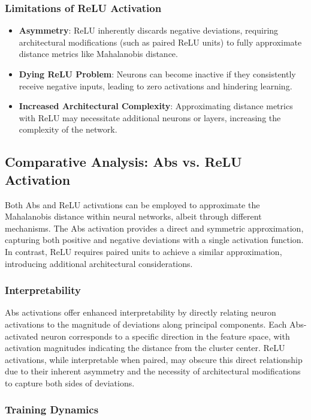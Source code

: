 \subsubsection{Limitations of ReLU Activation}

\begin{itemize}
    \item \textbf{Asymmetry}: ReLU inherently discards negative deviations, requiring architectural modifications (such as paired ReLU units) to fully approximate distance metrics like Mahalanobis distance.
    \item \textbf{Dying ReLU Problem}: Neurons can become inactive if they consistently receive negative inputs, leading to zero activations and hindering learning.
    \item \textbf{Increased Architectural Complexity}: Approximating distance metrics with ReLU may necessitate additional neurons or layers, increasing the complexity of the network.
\end{itemize}

\subsection{Comparative Analysis: Abs vs. ReLU Activation}

Both Abs and ReLU activations can be employed to approximate the Mahalanobis distance within neural networks, albeit through different mechanisms. The Abs activation provides a direct and symmetric approximation, capturing both positive and negative deviations with a single activation function. In contrast, ReLU requires paired units to achieve a similar approximation, introducing additional architectural considerations.

\subsubsection{Interpretability}

Abs activations offer enhanced interpretability by directly relating neuron activations to the magnitude of deviations along principal components. Each Abs-activated neuron corresponds to a specific direction in the feature space, with activation magnitudes indicating the distance from the cluster center. ReLU activations, while interpretable when paired, may obscure this direct relationship due to their inherent asymmetry and the necessity of architectural modifications to capture both sides of deviations.

\subsubsection{Training Dynamics}

